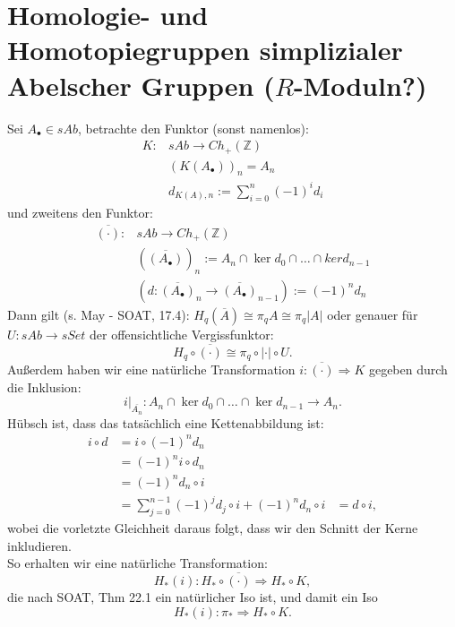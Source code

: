 \documentclass[11pt,twoside,a4paper]{scrbook} %
\begin{document}
\section{Homologie- und Homotopiegruppen simplizialer Abelscher Gruppen ($R$-Moduln?)}
Sei $A_\bullet \in sAb$, betrachte den Funktor (sonst namenlos):
$$\begin{aligned}K\colon &sAb \longrightarrow Ch_+(\mathbb{Z})\\
                         &(K(A_\bullet))_n = A_n\\
                         & d_{K(A),n}:=\sum_{i=0}^n(-1)^id_i\end{aligned}$$
und zweitens den Funktor:
$$\begin{aligned}\overline{(\cdot)}\colon& sAb \rightarrow Ch_+(\mathbb{Z})\\
                                         & (\overline{(A_\bullet)})_n := A_n\cap \ker d_0 \cap \ldots \cap ker d_{n-1}\\
                                         & (d\colon \overline{(A_\bullet)}_n \rightarrow \overline{(A_\bullet)}_{n-1}):=(-1)^nd_n\end{aligned}$$
Dann gilt (s. May - SOAT, 17.4): $H_q(\overline{A})\cong \pi_qA\cong \pi_q|A|$ oder genauer f\"ur $U\colon sAb \rightarrow sSet$ der offensichtliche
Vergissfunktor: $$H_q\circ \overline{(\cdot)} \cong \pi_q \circ |\cdot| \circ U.$$
Au\ss erdem haben wir eine nat\"urliche Transformation $i\colon \overline{(\cdot)} \Rightarrow K$ gegeben durch die Inklusion:
$$i|_{\overline{A_n}}\colon A_n\cap \ker d_0\cap \ldots \cap \ker d_{n-1} \rightarrow A_n.$$
H\"ubsch ist, dass das tats\"achlich eine Kettenabbildung ist:
$$\begin{aligned}
i\circ d &= i \circ (-1)^nd_n&\\
         &= (-1)^n i\circ d_n&\\
         &= (-1)^n d_n\circ i&\\
         &=\sum_{j=0}^{n-1}(-1)^jd_j\circ i +(-1)^n d_n \circ i &=d\circ i,
\end{aligned}$$
wobei die vorletzte Gleichheit daraus folgt, dass wir den Schnitt der Kerne inkludieren.\\
So erhalten wir eine nat\"urliche Transformation:
$$H_*(i)\colon H_*\circ \overline{(\cdot)}\Rightarrow H_*\circ K,$$
die nach SOAT, Thm 22.1 ein nat\"urlicher Iso ist, und damit ein Iso $$H_*(i)\colon \pi_* \Rightarrow H_*\circ K.$$
\end{document}
